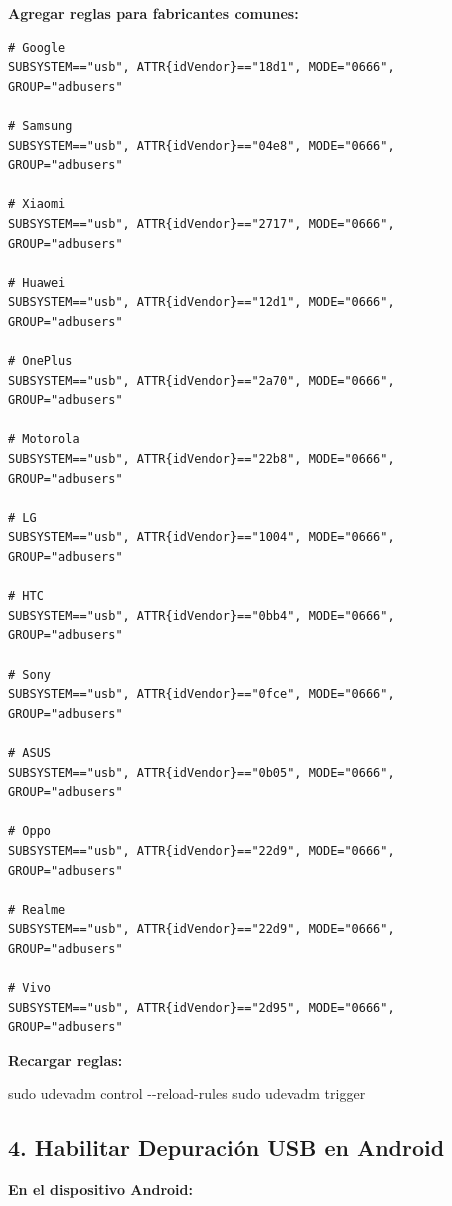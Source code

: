 \documentclass[
  doc,
  floatsintext,
  longtable,
  a4paper,
  nolmodern,
  notxfonts,
  notimes,
  12pt,
  colorlinks=true,linkcolor=blue,citecolor=blue,urlcolor=blue]{apa7}
\newenvironment{Shaded}{\begin{snugshade}}{\end{snugshade}}
\newcommand{\AttributeTok}[1]{\textcolor[rgb]{0.40,0.45,0.13}{#1}}
\newcommand{\FunctionTok}[1]{\textcolor[rgb]{0.28,0.35,0.67}{#1}}
\newcommand{\NormalTok}[1]{\textcolor[rgb]{0.00,0.23,0.31}{#1}}
\begin{document}
\textbf{Agregar reglas para fabricantes comunes:}

\begin{verbatim}
# Google
SUBSYSTEM=="usb", ATTR{idVendor}=="18d1", MODE="0666", GROUP="adbusers"

# Samsung
SUBSYSTEM=="usb", ATTR{idVendor}=="04e8", MODE="0666", GROUP="adbusers"

# Xiaomi
SUBSYSTEM=="usb", ATTR{idVendor}=="2717", MODE="0666", GROUP="adbusers"

# Huawei
SUBSYSTEM=="usb", ATTR{idVendor}=="12d1", MODE="0666", GROUP="adbusers"

# OnePlus
SUBSYSTEM=="usb", ATTR{idVendor}=="2a70", MODE="0666", GROUP="adbusers"

# Motorola
SUBSYSTEM=="usb", ATTR{idVendor}=="22b8", MODE="0666", GROUP="adbusers"

# LG
SUBSYSTEM=="usb", ATTR{idVendor}=="1004", MODE="0666", GROUP="adbusers"

# HTC
SUBSYSTEM=="usb", ATTR{idVendor}=="0bb4", MODE="0666", GROUP="adbusers"

# Sony
SUBSYSTEM=="usb", ATTR{idVendor}=="0fce", MODE="0666", GROUP="adbusers"

# ASUS
SUBSYSTEM=="usb", ATTR{idVendor}=="0b05", MODE="0666", GROUP="adbusers"

# Oppo
SUBSYSTEM=="usb", ATTR{idVendor}=="22d9", MODE="0666", GROUP="adbusers"

# Realme
SUBSYSTEM=="usb", ATTR{idVendor}=="22d9", MODE="0666", GROUP="adbusers"

# Vivo
SUBSYSTEM=="usb", ATTR{idVendor}=="2d95", MODE="0666", GROUP="adbusers"
\end{verbatim}

\textbf{Recargar reglas:}

\begin{Shaded}
\begin{Highlighting}[]
\FunctionTok{sudo}\NormalTok{ udevadm control }\AttributeTok{{-}{-}reload{-}rules}
\FunctionTok{sudo}\NormalTok{ udevadm trigger}
\end{Highlighting}
\end{Shaded}

\subsection{4. Habilitar Depuración USB en
Android}\label{habilitar-depuraciuxf3n-usb-en-android}

\textbf{En el dispositivo Android:}
\end{document}
